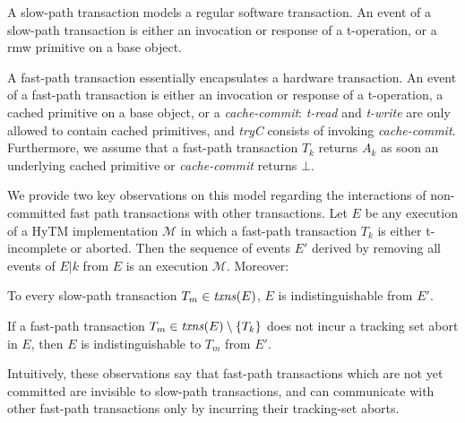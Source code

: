 A slow-path transaction models a regular software transaction.
An event of a slow-path transaction is either an invocation or response of a t-operation, or
a  rmw primitive on a base object. 

A fast-path transaction essentially encapsulates a hardware transaction. 
An event of a fast-path transaction is either an invocation or response of a t-operation, 
a cached primitive on a base object, or a \emph{cache-commit}:
\textit{t-read} and \emph{t-write} are only allowed to contain cached
primitives, and \textit{tryC} consists of invoking \emph{cache-commit}.  
Furthermore, we assume that a fast-path transaction $T_k$ returns $A_k$
as soon an underlying cached primitive or \emph{cache-commit} returns $\bot$. 

We provide two key observations on this model regarding the interactions of non-committed fast path transactions 
with other transactions. 
Let $E$ be any execution of a HyTM implementation $\mathcal{M}$ in
which a fast-path transaction $T_k$ is either
t-incomplete or aborted. 
Then the sequence of events $E'$ derived by removing all events of $E|k$
from $E$ is an execution  $\mathcal{M}$. Moreover: 
\begin{observation} 
\label{ob:one}
To every slow-path transaction $T_m \in \ms{txns}(E)$, $E$ is indistinguishable 
from $E'$. 
\end{observation}
%
% 	 
%
\begin{observation} 
\label{ob:two}
If a fast-path transaction $T_m\in \ms{txns}(E) \setminus \{T_k\}$ does not incur a tracking set abort in $E$, 
then $E$ is indistinguishable to $T_m$ from $E'$.
\end{observation}
%
Intuitively, these observations say that fast-path transactions which are not yet committed are 
invisible to slow-path transactions, and can communicate with other
fast-path transactions only by incurring their tracking-set aborts.
